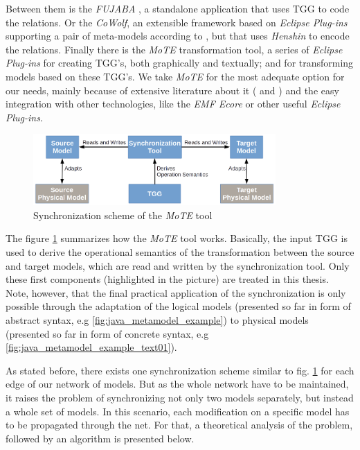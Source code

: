 \documentclass[tuberlin,cic,tc,english,noabntcite]{iiufrgs}
\begin{document}
Between them is the \emph{FUJABA} \citep{nickel2000fujaba}, a standalone application that uses TGG to code the relations. Or the \emph{CoWolf}, an extensible framework based on \emph{Eclipse Plug-ins} supporting a pair of meta-models according to \citet{getircowolf}, but that uses \emph{Henshin} \citep{arendt2010henshin} to encode the relations. Finally there is the \emph{MoTE} transformation tool, a series of \emph{Eclipse Plug-ins} for creating TGG's, both graphically and textually; and for transforming models based on these TGG's. We take \emph{MoTE} for the most adequate option for our needs, mainly because of extensive literature about it (\citep{giese2009efficient} and \citep{hildebrandt2012mdelab}) and the easy integration with other technologies, like the \emph{EMF Ecore} or other useful \emph{Eclipse Plug-ins}.

\begin{figure}[h]
    \caption{Synchronization scheme of the \emph{MoTE} tool}
    \begin{center}
        \includegraphics[width=25em]{MoTE_scheme}
    \end{center}
    \label{fig:MoTE_scheme}
\end{figure}

The figure \ref{fig:MoTE_scheme} summarizes how the \emph{MoTE} tool works. Basically, the input TGG is used to derive the operational semantics of the transformation between the source and target models, which are read and written by the synchronization tool. Only these first components (highlighted in the picture) are treated in this thesis. Note, however, that the final practical application of the synchronization is only possible through the adaptation of the logical models (presented so far in form of abstract syntax, e.g \ref{fig:java_metamodel_example}) to physical models (presented so far in form of concrete syntax, e.g \ref{fig:java_metamodel_example_text01}).

As stated before, there exists one synchronization scheme similar to fig. \ref{fig:MoTE_scheme} for each edge of our network of models. But as the whole network have to be maintained, it raises the problem of synchronizing not only two models separately, but instead a whole set of models. In this scenario, each modification on a specific model has to be propagated through the net. For that, a theoretical analysis of the problem, followed by an algorithm is presented below.
\end{document}
